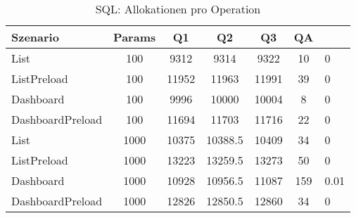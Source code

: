 \begin{table}[ht]
\centering
\caption{SQL: Allokationen pro Operation}
\begin{tabular}{lccccc}
\toprule
Szenario & Params & Q1 & Q2 & Q3 & QA \\
\midrule
	List & 100 & 9312 & 9314 & 9322 & 10 & 0 \\
	ListPreload & 100 & 11952 & 11963 & 11991 & 39 & 0 \\
	Dashboard & 100 & 9996 & 10000 & 10004 & 8 & 0 \\
	DashboardPreload & 100 & 11694 & 11703 & 11716 & 22 & 0 \\
	List & 1000 & 10375 & 10388.5 & 10409 & 34 & 0 \\
	ListPreload & 1000 & 13223 & 13259.5 & 13273 & 50 & 0 \\
	Dashboard & 1000 & 10928 & 10956.5 & 11087 & 159 & 0.01 \\
	DashboardPreload & 1000 & 12826 & 12850.5 & 12860 & 34 & 0 \\
\bottomrule
\end{tabular}
\label{tab:benchmark_sql_allocsperop}
\end{table}
	
